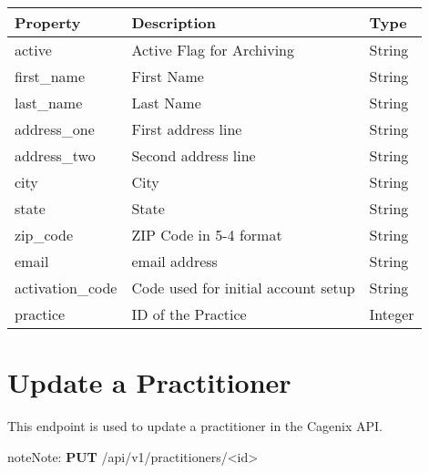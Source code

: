 \documentclass[letterpaper,10pt,english]{sphinxmanual}
\begin{document}
\begin{tabulary}{\linewidth}{|L|L|L|}
\hline
\textsf{\relax 
Property
} & \textsf{\relax 
Description
} & \textsf{\relax 
Type
}\\
\hline
active
 & 
Active Flag for Archiving
 & 
String
\\

first\_name
 & 
First Name
 & 
String
\\

last\_name
 & 
Last Name
 & 
String
\\

address\_one
 & 
First address line
 & 
String
\\

address\_two
 & 
Second address line
 & 
String
\\

city
 & 
City
 & 
String
\\

state
 & 
State
 & 
String
\\

zip\_code
 & 
ZIP Code in 5-4 format
 & 
String
\\

email
 & 
email address
 & 
String
\\

activation\_code
 & 
Code used for initial account
setup
 & 
String
\\

practice
 & 
ID of the Practice
 & 
Integer
\\
\hline\end{tabulary}



\section{Update a Practitioner}
\label{dev-api-practitioners:update-a-practitioner}
This endpoint is used to update a practitioner in the Cagenix API.

\begin{notice}{note}{Note:}
\textbf{PUT} /api/v1/practitioners/\textless{}id\textgreater{}
\end{notice}
\end{document}
